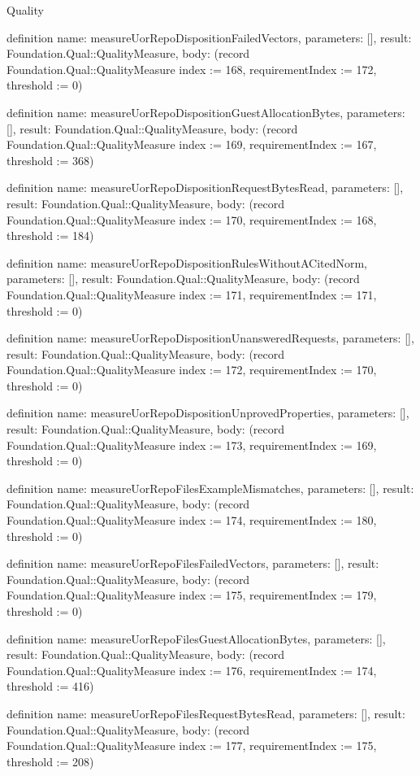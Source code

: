 \begin{lexlean}{Quality}
\begin{semanticmodule}
definition{
  name: measureUorRepoDispositionFailedVectors,
  parameters: [],
  result: Foundation.Qual::QualityMeasure,
  body: (record Foundation.Qual::QualityMeasure {index := 168, requirementIndex := 172, threshold := 0})
}

definition{
  name: measureUorRepoDispositionGuestAllocationBytes,
  parameters: [],
  result: Foundation.Qual::QualityMeasure,
  body: (record Foundation.Qual::QualityMeasure {index := 169, requirementIndex := 167, threshold := 368})
}

definition{
  name: measureUorRepoDispositionRequestBytesRead,
  parameters: [],
  result: Foundation.Qual::QualityMeasure,
  body: (record Foundation.Qual::QualityMeasure {index := 170, requirementIndex := 168, threshold := 184})
}

definition{
  name: measureUorRepoDispositionRulesWithoutACitedNorm,
  parameters: [],
  result: Foundation.Qual::QualityMeasure,
  body: (record Foundation.Qual::QualityMeasure {index := 171, requirementIndex := 171, threshold := 0})
}

definition{
  name: measureUorRepoDispositionUnansweredRequests,
  parameters: [],
  result: Foundation.Qual::QualityMeasure,
  body: (record Foundation.Qual::QualityMeasure {index := 172, requirementIndex := 170, threshold := 0})
}

definition{
  name: measureUorRepoDispositionUnprovedProperties,
  parameters: [],
  result: Foundation.Qual::QualityMeasure,
  body: (record Foundation.Qual::QualityMeasure {index := 173, requirementIndex := 169, threshold := 0})
}

definition{
  name: measureUorRepoFilesExampleMismatches,
  parameters: [],
  result: Foundation.Qual::QualityMeasure,
  body: (record Foundation.Qual::QualityMeasure {index := 174, requirementIndex := 180, threshold := 0})
}

definition{
  name: measureUorRepoFilesFailedVectors,
  parameters: [],
  result: Foundation.Qual::QualityMeasure,
  body: (record Foundation.Qual::QualityMeasure {index := 175, requirementIndex := 179, threshold := 0})
}

definition{
  name: measureUorRepoFilesGuestAllocationBytes,
  parameters: [],
  result: Foundation.Qual::QualityMeasure,
  body: (record Foundation.Qual::QualityMeasure {index := 176, requirementIndex := 174, threshold := 416})
}

definition{
  name: measureUorRepoFilesRequestBytesRead,
  parameters: [],
  result: Foundation.Qual::QualityMeasure,
  body: (record Foundation.Qual::QualityMeasure {index := 177, requirementIndex := 175, threshold := 208})
}


\end{semanticmodule}
\end{lexlean}
